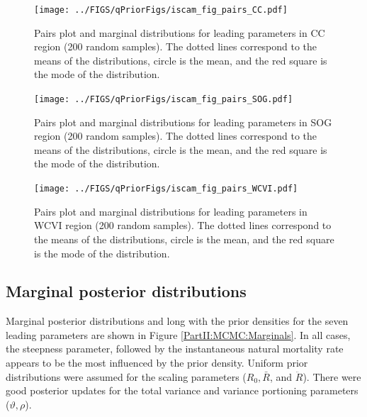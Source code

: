 \begin{figure}[!tbp]
	\texttt{[image: ../FIGS/qPriorFigs/iscam\_fig\_pairs\_CC.pdf]}\\
	\caption{Pairs plot and marginal distributions for leading parameters in CC region (200 random samples).  The dotted lines correspond to the means of the distributions, circle is the mean, and the red square is the mode of the distribution.}\label{PartII:MCMC:pairsCC}
\end{figure}

\begin{figure}[!tbp]
	\texttt{[image: ../FIGS/qPriorFigs/iscam\_fig\_pairs\_SOG.pdf]}\\
	\caption{Pairs plot and marginal distributions for leading parameters in SOG region (200 random samples).  The dotted lines correspond to the means of the distributions, circle is the mean, and the red square is the mode of the distribution.}\label{PartII:MCMC:pairsSOG}
\end{figure}

\begin{figure}[!tbp]
	\texttt{[image: ../FIGS/qPriorFigs/iscam\_fig\_pairs\_WCVI.pdf]}\\
	\caption{Pairs plot and marginal distributions for leading parameters in WCVI region (200 random samples).  The dotted lines correspond to the means of the distributions, circle is the mean, and the red square is the mode of the distribution.}\label{PartII:MCMC:pairsWCVI}
\end{figure}

\subsection{Marginal posterior distributions}

Marginal posterior distributions and long with the prior densities for the seven leading parameters are shown in Figure \ref{PartII:MCMC:Marginals}. In all cases, the steepness parameter, followed by the instantaneous natural mortality rate appears to be the most influenced by the prior density. Uniform prior distributions were assumed for the scaling parameters ($R_0, \bar{R}$, and $\ddot{R}$).  There were good posterior updates for the total variance and variance portioning parameters ($\vartheta, \rho$).

